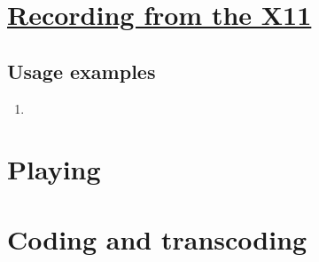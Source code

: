 \chapter{\href{}{Recording from the X11}}

\section{Usage examples}
\begin{enumerate}

\item

\end{enumerate}

\chapter{Playing}

\chapter{Coding and transcoding}

